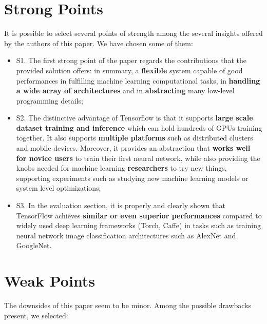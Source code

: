 \documentclass[10pt]{proc}
\begin{document}
\section{Strong Points}
It is possible to select several points of strength among the several insights offered by the authors of this paper. We have chosen some of them:
\begin{itemize}
 \item S1.  The first strong point of the paper regards the contributions that the provided solution offers: in summary, a \textbf{flexible} system capable of good performances in fulfilling machine learning computational tasks, in \textbf{handling a wide array of architectures} and in \textbf{abstracting} many low-level programming details;
 \item S2. The distinctive advantage of Tensorflow is that it supports \textbf{large scale dataset training and inference} which can hold hundreds of GPUs training together. It also supports \textbf{multiple platforms} such as distributed clusters and mobile devices. Moreover, it
 provides an abstraction that \textbf{works well for novice users} to train their first neural network, while also providing the knobs needed for machine learning \textbf{researchers} to try new things, supporting experiments such as studying new machine learning models or system level optimizations;
 \item S3.  In the evaluation section, it is properly and clearly shown that TensorFlow achieves \textbf{similar or even superior performances} compared to widely used deep learning frameworks (Torch, Caffe) in tasks such as training neural network image classification architectures such as AlexNet and GoogleNet.
\end{itemize}

\section{Weak Points}

The downsides of this paper seem to be minor. Among the possible drawbacks present, we selected:
\end{document}
